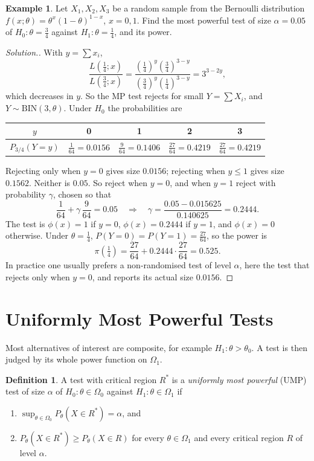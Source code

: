 \documentclass[12pt,a4paper]{report}
\theoremstyle{definition}
\newtheorem{definition}[thm]{Definition}
\newtheorem{example}[thm]{Example}
\theoremstyle{plain}
\newenvironment{solution}
  {\renewcommand{\qedsymbol}{}\begin{proof}[\textit{Solution}.]}
  {\end{proof}}
\begin{document}
\begin{example}
\label{ex:randomised}
Let $X_1,X_2,X_3$ be a random sample from the Bernoulli distribution
$f(x;\theta) = \theta^x(1 - \theta)^{1 - x}$, $x = 0,1$. Find the most powerful
test of size $\alpha = 0.05$ of $H_0\colon\theta = \frac34$ against
$H_1\colon\theta = \frac14$, and its power.
\end{example}

\begin{solution}
With $y = \sum x_i$,
\[\frac{L(\frac14;x)}{L(\frac34;x)}
= \frac{(\frac14)^y(\frac34)^{3 - y}}{(\frac34)^y(\frac14)^{3 - y}} = 3^{3 - 2y},\]
which decreases in $y$. So the MP test rejects for small $Y = \sum X_i$, and
$Y\sim\text{BIN}(3,\theta)$. Under $H_0$ the probabilities are
\begin{table}[H]
\centering
\begin{tabular}{c|cccc}
$y$ & 0 & 1 & 2 & 3\\
\hline
$P_{3/4}(Y = y)$ & $\frac{1}{64} = 0.0156$ & $\frac{9}{64} = 0.1406$ & $\frac{27}{64} = 0.4219$ & $\frac{27}{64} = 0.4219$
\end{tabular}
\end{table}
Rejecting only when $y = 0$ gives size $0.0156$; rejecting when $y\le 1$ gives
size $0.1562$. Neither is $0.05$. So reject when $y = 0$, and when $y = 1$ reject
with probability $\gamma$, chosen so that
\[\frac{1}{64} + \gamma\,\frac{9}{64} = 0.05
\quad\Longrightarrow\quad \gamma = \frac{0.05 - 0.015625}{0.140625} = 0.2444 .\]
The test is $\phi(x) = 1$ if $y = 0$, $\phi(x) = 0.2444$ if $y = 1$, and
$\phi(x) = 0$ otherwise. Under $\theta = \frac14$, $P(Y = 0) = P(Y = 1) =
\frac{27}{64}$, so the power is
\[\pi\left(\tfrac14\right) = \frac{27}{64} + 0.2444\cdot\frac{27}{64} = 0.525 .\]
In practice one usually prefers a non-randomised test of level $\alpha$, here the
test that rejects only when $y = 0$, and reports its actual size $0.0156$.
\end{solution}

\section{Uniformly Most Powerful Tests}

Most alternatives of interest are composite, for example $H_1\colon\theta>\theta_0$.
A test is then judged by its whole power function on $\Omega_1$.

\begin{definition}
\label{def:ump}
A test with critical region $R^*$ is a \emph{uniformly most powerful} (UMP) test
of size $\alpha$ of $H_0\colon\theta\in\Omega_0$ against
$H_1\colon\theta\in\Omega_1$ if
\begin{enumerate}
\item[(i)] $\sup_{\theta\in\Omega_0} P_\theta(X\in R^*) = \alpha$, and
\item[(ii)] $P_\theta(X\in R^*)\ge P_\theta(X\in R)$ for every
$\theta\in\Omega_1$ and every critical region $R$ of level $\alpha$.
\end{enumerate}
\end{definition}
\end{document}
